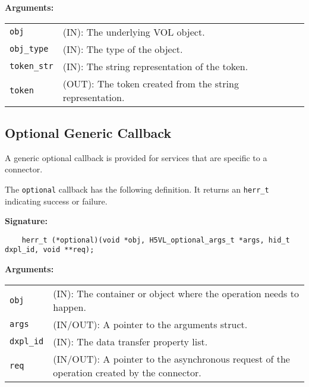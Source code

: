 \begin{mdframed}[style=bgbox]
\textbf{Arguments:}\\
\begin{tabular}{l p{13.5cm}}
  \texttt{obj} & (IN): The underlying VOL object.\\
  \texttt{obj\_type} & (IN): The type of the object.\\
  \texttt{token\_str} & (IN): The string representation of the token.\\
  \texttt{token} & (OUT): The token created from the string representation.\\
\end{tabular}
\end{mdframed}


\subsection{Optional Generic Callback}
A generic optional callback is provided for services that are specific to a connector.

The \texttt{optional} callback has the following definition. It returns an \texttt{herr\_t} indicating success or failure.\bigskip 

\begin{mdframed}[style=bgbox]
\textbf{Signature:}
\begin{lstlisting}
    herr_t (*optional)(void *obj, H5VL_optional_args_t *args, hid_t dxpl_id, void **req);
\end{lstlisting}

\textbf{Arguments:}\\
\begin{tabular}{l p{13.5cm}}
  \texttt{obj} & (IN): The container or object where the operation needs to happen.\\
  \texttt{args} & (IN/OUT): A pointer to the arguments struct.\\
  \texttt{dxpl\_id} & (IN): The data transfer property list.\\
  \texttt{req} & (IN/OUT): A pointer to the asynchronous request of the operation created by the connector.\\
\end{tabular}
\end{mdframed}

